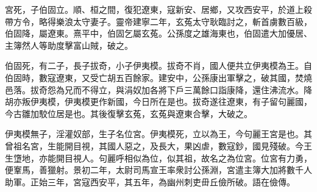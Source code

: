 \begin{pinyinscope}
 
 
 
 宮死，子伯固立。順、桓之間，復犯遼東，寇新安、居鄉，又攻西安平，於道上殺帶方令，略得樂浪太守妻子。靈帝建寧二年，玄菟太守耿臨討之，斬首虜數百級，伯固降，屬遼東。熹平中，伯固乞屬玄菟。公孫度之雄海東也，伯固遣大加優居、主簿然人等助度擊富山賊，破之。
 
 
 
 
 伯固死，有二子，長子拔奇，小子伊夷模。拔奇不肖，國人便共立伊夷模為王。自伯固時，數寇遼東，又受亡胡五百餘家。建安中，公孫康出軍擊之，破其國，焚燒邑落。拔奇怨為兄而不得立，與涓奴加各將下戶三萬餘口詣康降，還住沸流水。降胡亦叛伊夷模，伊夷模更作新國，今日所在是也。拔奇遂往遼東，有子留句麗國，今古雛加駮位居是也。其後復擊玄菟，玄菟與遼東合擊，大破之。
 
 
 
 
 伊夷模無子，淫灌奴部，生子名位宮。伊夷模死，立以為王，今句麗王宮是也。其曾祖名宮，生能開目視，其國人惡之，及長大，果凶虐，數寇鈔，國見殘破。今王生墯地，亦能開目視人。句麗呼相似為位，似其祖，故名之為位宮。位宮有力勇，便鞌馬，善獵射。景初二年，太尉司馬宣王率衆討公孫淵，宮遣主簿大加將數千人助軍。正始三年，宮寇西安平，其五年，為幽州刺吏毌丘儉所破。語在儉傳。
 
 
\end{pinyinscope}